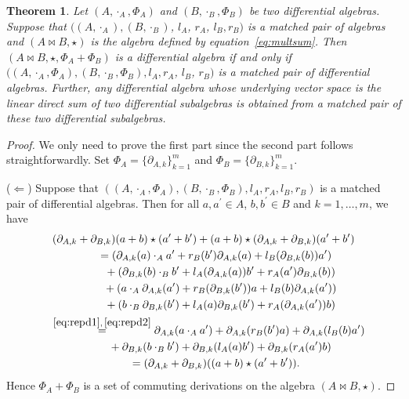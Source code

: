 \documentclass[10pt,a4paper]{amsart}
\numberwithin{equation}{section}
\newtheorem{Theorem}{Theorem}[section]
\begin{document}
\begin{Theorem}\label{thm:matda}
 Let $(A, \cdot_A, \Phi_A)$ and $(B, \cdot_B, \Phi_B)$ be two differential algebras.
 Suppose that $((A, \cdot_A), (B, \cdot_B)$, $l_A$, $r_A$, $l_B, r_B)$ is a matched pair of algebras and
 $(A \bowtie B, \star)$ is the algebra defined by equation~\eqref{eq:multsum}.
 Then $(A \bowtie B, \star, \Phi_A + \Phi_B)$ is a differential algebra if and only if
 $((A, \cdot_A, \Phi_A), (B, \cdot_B, \Phi_B), l_A, r_A$, $l_B$, $r_B)$ is a matched pair of differential algebras.
 Further, any differential algebra whose underlying vector space is the linear direct sum of two differential subalgebras is obtained from a matched pair of these two differential subalgebras.
\end{Theorem}
\begin{proof}
 We only need to prove the first part since the second part follows straightforwardly. Set $\Phi_A = \{\partial_{A,k}\}_{k=1}^m$ and $\Phi_B = \{\partial_{B,k}\}_{k=1}^m$.

 ($\Longleftarrow$)
 Suppose that $((A, \cdot_A, \Phi_A), (B, \cdot_B, \Phi_B), l_A, r_A, l_B, r_B)$ is a matched pair of differential algebras.
 Then for all $a, a^\prime \in A$, $b, b^\prime \in B$ and $k=1,\dots, m$, we have
 \begin{gather*}
(\partial_{A,k} + \partial_{B,k})(a + b) \star (a^\prime + b^\prime) + (a + b) \star (\partial_{A,k} + \partial_{B,k})(a^\prime + b^\prime) \\
 \qquad{} = (\partial_{A,k}(a) \cdot_A a^\prime + r_B(b^\prime)\partial_{A,k}(a) + l_B(\partial_{B,k}(b))a^\prime) \\
 \qquad \quad{}+ (\partial_{B,k}(b) \cdot_B b^\prime + l_A(\partial_{A,k}(a))b^\prime + r_A(a^\prime)\partial_{B,k}(b)) \\
 \qquad \quad{} + (a \cdot_A \partial_{A,k}(a^\prime) + r_B(\partial_{B,k}(b^\prime))a + l_B(b)\partial_{A,k}(a^\prime)) \\
 \qquad \quad{} + (b \cdot_B \partial_{B,k}(b^\prime) + l_A(a)\partial_{B,k}(b^\prime) + r_A(\partial_{A,k}(a^\prime))b) \\
\quad \overset{\eqref{eq:repd1}, \, \eqref{eq:repd2}}{=} \partial_{A,k}(a \cdot_A a^\prime) + \partial_{A,k}(r_B(b^\prime)a) + \partial_{A,k}(l_B(b)a^\prime) \\
 \qquad\quad{} + \partial_{B,k}(b \cdot_B b^\prime) + \partial_{B,k}(l_A(a)b^\prime) + \partial_{B,k}(r_A(a^\prime)b) \\
 \qquad {} = (\partial_{A,k}+\partial_{B,k})((a + b) \star (a^\prime + b^\prime)).
\end{gather*}
 Hence $\Phi_A + \Phi_B$ is a set of commuting derivations on the algebra $(A \bowtie B, \star)$.


\end{proof}
\end{document}
